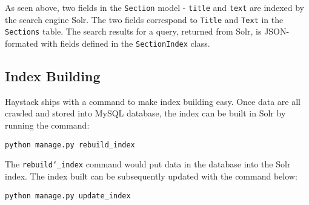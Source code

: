 As seen above, two fields in the \texttt{Section} model - \texttt{title} and \texttt{text} are indexed by the search engine Solr. The two fields correspond to \texttt{Title} and \texttt{Text} in the \texttt{Sections} table. The search results for a query, returned from Solr, is JSON-formated with fields defined in the \texttt{SectionIndex} class.

\subsection{Index Building}
\label{subsec:index_build}
Haystack ships with a command to make index building easy. Once data are all crawled and stored into MySQL database, the index can be built in Solr by running the command:
\begin{verbatim}
python manage.py rebuild_index
\end{verbatim}

The \texttt{rebuild\char`_index} command would put data in the database into the Solr index. The index built can be subsequently updated with the command below:
\begin{verbatim}
python manage.py update_index
\end{verbatim}
